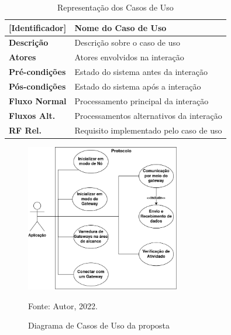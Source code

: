 \begin{longtable}{|p{2.65cm}|l|}
    \caption{Representação dos Casos de Uso}\label{tab:use-cases-def}\\
    \hline
    \textbf{[Identificador]} & Nome do Caso de Uso \\
    \hline
    \textbf{Descrição} & Descrição sobre o caso de uso \\
    \hline
    \textbf{Atores} & Atores envolvidos na interação \\
    \hline
    \textbf{Pré-condições} & Estado do sistema antes da interação \\
    \hline
    \textbf{Pós-condições} & Estado do sistema após a interação \\
    \hline
    \textbf{Fluxo Normal} & Processamento principal da interação \\
    \hline
    \textbf{Fluxos Alt.} & Processamentos alternativos da interação \\
    \hline
    \textbf{RF Rel.} & Requisito implementado pelo caso de uso \\
    \hline
\end{longtable}

\newpage

\begin{figure}[htp]
    \centering
	\caption{Diagrama de Casos de Uso da proposta}
    \includegraphics[width=0.6\textwidth,height=0.6\textheight,keepaspectratio]{img/use-cases.drawio.png}
    
    Fonte: Autor, 2022.
    \label{fig:use-cases}
\end{figure}

